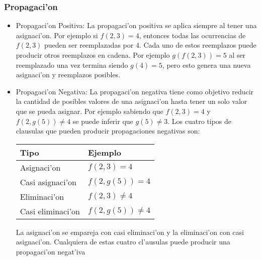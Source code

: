 \subsubsection{Propagaci'on}

\begin{itemize}

\item{Propagaci'on Positiva}:
La propagaci'on positiva se aplica siempre al tener una asignaci'on. Por ejemplo si $f(2,3)=4$, entonces todas las ocurrencias de $f(2,3)$ pueden ser reemplazadas por $4$. Cada uno de estos reemplazos puede producir otros reemplazos en cadena. Por ejemplo $g(f(2,3))=5$ al ser reemplazado una vez termina siendo $g(4)=5$, pero esto genera una nueva asignaci'on y reemplazos posibles.

\item{Propagaci'on Negativa}:
La propagaci'on negativa tiene como objetivo reducir la cantidad de posibles valores de una asignaci'on hasta tener un solo valor que se pueda asignar. Por ejemplo sabiendo que $f(2,3)=4$ y $f(2, g(5))\neq4$ se puede inferir que $g(5)\neq3$. Los cuatro tipos de clausulas que pueden producir propagaciones negativas son:

\medskip
\begin{center}
\begin{tabular}{ |l|l| }
\hline
Tipo & Ejemplo \\
\hline
Asignaci'on & $f(2,3)=4$ \\
Casi asignaci'on & $f(2,g(5))=4$ \\
Eliminaci'on & $f(2,3)\neq4$ \\
Casi eliminaci'on & $f(2,g(5))\neq4$ \\
\hline
\end{tabular}
\end{center}
\medskip

La asignaci'on se empareja con casi eliminaci'on y la eliminaci'on con casi asignaci'on. Cualquiera de estas cuatro cl'ausulas puede producir una propagaci'on negat'iva

\end{itemize}
